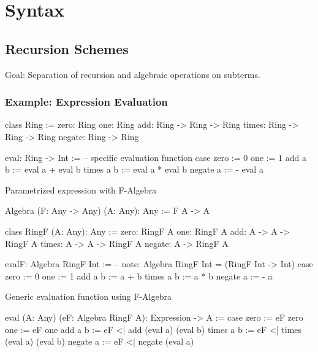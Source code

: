 \section{Syntax}


\subsection{Recursion Schemes}

Goal: Separation of recursion and algebraic operations on subterms.

\subsubsection{Example: Expression Evaluation}

\begin{alba}
    class Ring :=
        zero:   Ring
        one:    Ring
        add:    Ring -> Ring -> Ring
        times:  Ring -> Ring -> Ring
        negate: Ring -> Ring

    eval: Ring -> Int :=
            -- specific evaluation function
        case
            zero :=
                0
            one  :=
                1
            add a b :=
                eval a + eval b
            times a b :=
                eval a * eval b
            negate a :=
                - eval a
\end{alba}



\noindent Parametrized expression with F-Algebra

\begin{alba}
    Algebra (F: Any -> Any) (A: Any): Any :=
        F A -> A

    class RingF  (A: Any): Any :=
        zero:   RingF A
        one:    RingF A
        add:    A -> A -> RingF A
        times:  A -> A -> RingF A
        negate: A -> RingF A

    evalF: Algebra RingF Int :=
        -- note: Algebra RingF Int = (RingF Int -> Int)
        case
            zero :=
                0
            one :=
                1
            add a b :=
                a + b
            times a b :=
                a * b
            negate a :=
                - a
\end{alba}

\noindent Generic evaluation function using F-Algebra

\begin{alba}
    eval (A: Any) (eF: Algebra RingF A): Expression -> A
    :=
        case
            zero :=
                eF zero
            one :=
                eF one
            add a b :=
                eF <| add (eval a) (eval b)
            times a b :=
                eF <| times (eval a) (eval b)
            negate a :=
                eF <| negate (eval a)
\end{alba}



